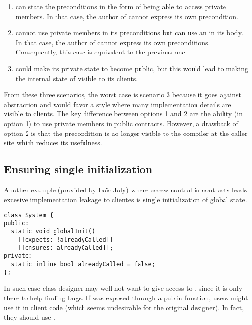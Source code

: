 \begin{enumerate}

\item {} can state the preconditions in the form of
\cppid{[[}\cppid{]]} being able to access private members. In
that case, the author of  cannot express its own
precondition.

\item {} cannot use private members in its
\cppid{[[}\cppid{]]} preconditions but can use an
\cppid{}\cppid{]]} in its body. In that case, the author of
 cannot express its own preconditions. Consequently,
this case is equivalent to the previous one.

\item {} could make its private state to become public, but this would
lead to making the internal state of  visible to its clients.

\end{enumerate}

From these three scenarios, the worst case is scenario 3 because it goes against
abstraction and would favor a style where many implementation details are
visible to clients. The key difference between options 1 and 2 are the ability
(in option 1) to use private members in public contracts. However, a drawback of
option 2 is that the precondition is no longer visible to the compiler at the
caller site which reduces its usefulness.

\subsection{Ensuring single initialization}

Another example (provided by Lo\"{i}c Joly) where access control in contracts leads excesive implementation
leakage to clientes is single initialization of global state.

\begin{lstlisting}
class System {
public:
  static void globalInit()
    [[expects: !alreadyCalled]]
    [[ensures: alreadyCalled]];
private:
  static inline bool alreadyCalled = false;
};
\end{lstlisting}

In such case class designer may well not want to give access to
, since it is only there to help finding bugs. If
 was exposed through a public 
function, users might use it in client code (which seems undesirable for the
original designer). In fact, they should use .

